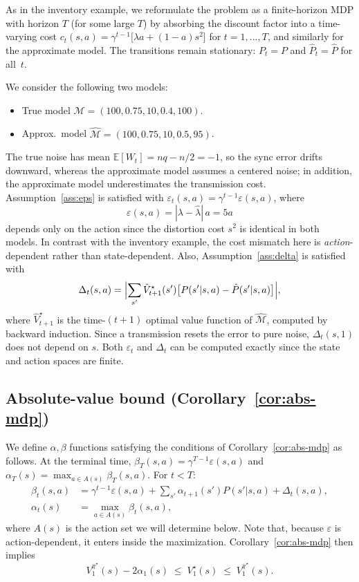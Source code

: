 \documentclass[10pt]{article}
\theoremstyle{definition}
\begin{document}
As in the inventory example, we reformulate the problem as a
finite-horizon MDP with horizon $T$ (for some large $T$) by absorbing
the discount factor into a time-varying cost
$c_t(s,a) = \gamma^{t-1}\bigl[\lambda a + (1-a)s^2\bigr]$ for
$t = 1, \dots, T$, and similarly for the approximate model. The
transitions remain stationary: $P_t = P$ and $\hat P_t = \hat P$ for
all~$t$.

We consider the following two models:
\begin{itemize}
  \item True model \phantom{Approx.\ }$\mathcal{M} = (100, 0.75, 10, 0.4, 100)$.
  \item Approx.\ model $\hat{\mathcal{M}} = (100, 0.75, 10, 0.5, 95)$.
\end{itemize}
The true noise has mean $\mathbb{E}[W_t] = nq - n/2 = -1$, so the sync
error drifts downward, whereas the approximate model assumes a centered
noise; in addition, the approximate model underestimates the
transmission cost. Assumption~\ref{ass:eps} is satisfied with
$\varepsilon_t(s,a) = \gamma^{t-1}\varepsilon(s,a)$, where
\[
\varepsilon(s,a) = |\lambda - \hat\lambda|\, a = 5a
\]
depends only on the action since the distortion cost $s^2$ is identical
in both models. In contrast with the inventory example, the cost
mismatch here is \emph{action}-dependent rather than state-dependent.
Also, Assumption~\ref{ass:delta} is satisfied with
\[
\Delta_t(s,a) = \Bigl|\sum_{s'} \hat V^\star_{t+1}(s')
  \bigl[P(s'|s,a) - \hat P(s'|s,a)\bigr]\Bigr|,
\]
where $\hat V^\star_{t+1}$ is the time-$(t{+}1)$ optimal value function
of $\hat{\mathcal{M}}$, computed by backward induction. Since a
transmission resets the error to pure noise, $\Delta_t(s,1)$ does not
depend on $s$. Both $\varepsilon_t$ and $\Delta_t$ can be computed
exactly since the state and action spaces are finite.

\subsection*{Absolute-value bound (Corollary~\ref{cor:abs-mdp})}

We define $\alpha, \beta$ functions satisfying the conditions of
Corollary~\ref{cor:abs-mdp} as follows. At the terminal time,
$\beta_T(s,a) = \gamma^{T-1}\varepsilon(s,a)$ and
$\alpha_T(s) = \max_{a \in A(s)} \beta_T(s,a)$. For $t < T$:
\begin{equation}
\begin{aligned}
\beta_t(s,a) &= \gamma^{t-1}\varepsilon(s,a)
  + \sum_{s'} \alpha_{t+1}(s') P(s'|s,a) + \Delta_t(s,a),\\
\alpha_t(s) &= \max_{a \in A(s)} \beta_t(s,a),
\end{aligned}
\label{eq:iot-alpha-beta}
\end{equation}
where $A(s)$ is the action set we will determine below. Note that,
because $\varepsilon$ is action-dependent, it enters inside the
maximization. Corollary~\ref{cor:abs-mdp} then implies
\begin{equation}
V^{\hat\pi^\star}_1(s) - 2\alpha_1(s)
\;\le\; V^\star_1(s) \;\le\; V^{\hat\pi^\star}_1(s).
\label{eq:iot-sandwich}
\end{equation}
\end{document}
